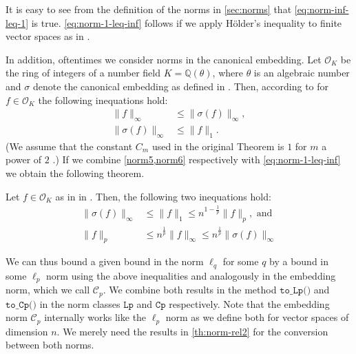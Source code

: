 It is easy to see from the definition of the norms in \cref{sec:norms} that \cref{eq:norm-inf-leq-1} is true. \cref{eq:norm-1-leq-inf} follows if we apply Hölder's inequality to finite vector spaces as in \cite{norm-relations}.

In addition, oftentimes we consider norms in the canonical embedding. Let $\mathcal{O}_K$ be the ring of integers of a number field $K=\mathbb{Q}(\theta)$, where $\theta$ is an algebraic number and $\sigma$ denote the canonical embedding as defined in \cite{DPSZ12}. Then, according to \cite[Theorem~7]{DPSZ12} for $f \in \mathcal{O}_K$  the following inequations hold: %
\begin{align}
    \| f \|_\infty         & \leq \| \sigma(f) \|_\infty \label{norm5}, \\
    \| \sigma(f) \|_\infty & \leq \| f \|_1 \label{norm6}.
\end{align}
(We assume that the constant $C_m$ used in the original Theorem is $1$ for $m$ a power of $2$ \cite[Lemma~3]{DPSZ12}.) If we combine \cref{norm5,norm6} respectively with \cref{eq:norm-1-leq-inf} we obtain the following theorem.
\begin{theorem}\label{th:norm-rel2}
    Let $f \in \mathcal{O}_K$ as in in \cite{DPSZ12}. Then, the following two inequations hold:
    \begin{align}
        \| \sigma(f) \|_\infty & \leq \| f \|_1 \leq n^{1 - \frac{1}{p}} \| f \|_p, \text{ and } \label{eq:Coo-norm}             \\
        \| f \|_p              & \leq  n^{\frac{1}{p}} \| f \|_\infty \leq n^{\frac{1}{p}}  \| \sigma(f) \|_\infty \label{norm7}
    \end{align}
\end{theorem}
We can thus bound a given bound in the norm $\ell_q$ for some $q$ by a bound in some $\ell_p$ norm using the above inequalities and analogously in the embedding norm, which we call $\mathcal{C}_p$. We combine both results in the method $\texttt{to\_Lp()}$ and $\texttt{to\_Cp()}$ in the norm classes $\texttt{Lp}$ and $\texttt{Cp}$ respectively. Note that the embedding norm $\mathcal{C}_p$ internally works like the $\ell_p$ norm as we define both for vector spaces of dimension $n$. We merely need the results in \cref{th:norm-rel2} for the conversion between both norms.

